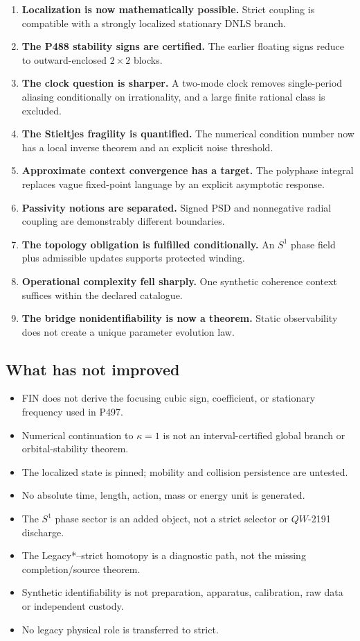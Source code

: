 \documentclass[11pt,a4paper]{article}
\theoremstyle{definition}
\theoremstyle{remark}
\begin{document}
\begin{enumerate}
\item \textbf{Localization is now mathematically possible.} Strict coupling is compatible with a strongly localized stationary DNLS branch.
\item \textbf{The P488 stability signs are certified.} The earlier floating signs reduce to outward-enclosed $2\times2$ blocks.
\item \textbf{The clock question is sharper.} A two-mode clock removes single-period aliasing conditionally on irrationality, and a large finite rational class is excluded.
\item \textbf{The Stieltjes fragility is quantified.} The numerical condition number now has a local inverse theorem and an explicit noise threshold.
\item \textbf{Approximate context convergence has a target.} The polyphase integral replaces vague fixed-point language by an explicit asymptotic response.
\item \textbf{Passivity notions are separated.} Signed PSD and nonnegative radial coupling are demonstrably different boundaries.
\item \textbf{The topology obligation is fulfilled conditionally.} An $S^1$ phase field plus admissible updates supports protected winding.
\item \textbf{Operational complexity fell sharply.} One synthetic coherence context suffices within the declared catalogue.
\item \textbf{The bridge nonidentifiability is now a theorem.} Static observability does not create a unique parameter evolution law.
\end{enumerate}

\subsection{What has not improved}

\begin{itemize}
\item FIN does not derive the focusing cubic sign, coefficient, or stationary frequency used in P497.
\item Numerical continuation to $\kappa=1$ is not an interval-certified global branch or orbital-stability theorem.
\item The localized state is pinned; mobility and collision persistence are untested.
\item No absolute time, length, action, mass or energy unit is generated.
\item The $S^1$ phase sector is an added object, not a strict selector or $QW$-2191 discharge.
\item The Legacy*--strict homotopy is a diagnostic path, not the missing completion/source theorem.
\item Synthetic identifiability is not preparation, apparatus, calibration, raw data or independent custody.
\item No legacy physical role is transferred to strict.
\end{itemize}
\end{document}
